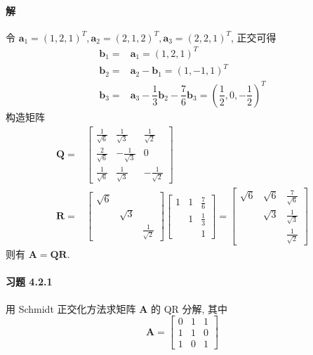 \documentclass[12pt, a4paper, oneside, fontset=none]{ctexart}
\begin{document}
\paragraph*{解} 令 $\bm{a}_1 = (1, 2, 1)^T, \bm{a}_2 = (2, 1, 2)^T, \bm{a}_3 = (2, 2, 1)^T$, 正交可得
\begin{align*}
    \bm{b}_1 = & \bm{a}_1 = (1, 2, 1)^T                                                                      \\
    \bm{b}_2 = & \bm{a}_2 - \bm{b}_1 = (1, -1, 1)^T                                                          \\
    \bm{b}_3 = & \bm{a}_3 - \dfrac{1}{3}\bm{b}_2 - \dfrac{7}{6}\bm{b}_3 = (\dfrac{1}{2}, 0, -\dfrac{1}{2})^T
\end{align*}
构造矩阵
\begin{align*}
    \bm{Q} = & \begin{bmatrix}
                   \frac{1}{\sqrt{6}} & \frac{1}{\sqrt{3}}  & \frac{1}{\sqrt{2}}  \\
                   \frac{2}{\sqrt{6}} & -\frac{1}{\sqrt{3}} & 0                   \\
                   \frac{1}{\sqrt{6}} & \frac{1}{\sqrt{3}}  & -\frac{1}{\sqrt{2}}
               \end{bmatrix} \\
    \bm{R} = & \begin{bmatrix}
                   \sqrt{6} &          &                    \\
                            & \sqrt{3} &                    \\
                            &          & \frac{1}{\sqrt{2}}
               \end{bmatrix}
    \begin{bmatrix}
        1 & 1 & \frac{7}{6} \\
          & 1 & \frac{1}{3} \\
          &   & 1
    \end{bmatrix} =
    \begin{bmatrix}
        \sqrt{6} & \sqrt{6} & \frac{7}{\sqrt{6}} \\
                 & \sqrt{3} & \frac{1}{\sqrt{3}} \\
                 &          & \frac{1}{\sqrt{2}}
    \end{bmatrix}
\end{align*}
则有 $\bm{A} = \bm{QR}$.

\paragraph*{习题 4.2.1} 用 Schmidt 正交化方法求矩阵 $\bm{A}$ 的 QR 分解, 其中
$$
    \bm{A} = \begin{bmatrix}
        0 & 1 & 1 \\
        1 & 1 & 0 \\
        1 & 0 & 1
    \end{bmatrix}
$$
\end{document}
